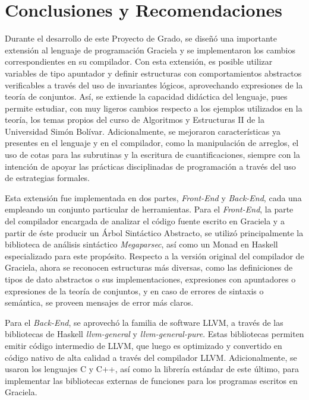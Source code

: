 \chapter*{Conclusiones y Recomendaciones}
\label{conclusiones}

Durante el desarrollo de este Proyecto de Grado, se diseñó una importante
extensión al lenguaje de programación Graciela y se implementaron los cambios
correspondientes en su compilador. Con esta extensión, es posible utilizar
variables de tipo apuntador y definir estructuras con comportamientos abstractos
verificables a través del uso de invariantes lógicos, aprovechando expresiones
de la teoría de conjuntos. Así, se extiende la capacidad didáctica del lenguaje,
pues permite estudiar, con muy ligeros cambios respecto a los ejemplos
utilizados en la teoría, los temas propios del curso de Algoritmos y Estructuras
II de la Universidad Simón Bolívar. Adicionalmente, se mejoraron características
ya presentes en el lenguaje y en el compilador, como la manipulación de
arreglos, el uso de cotas para las subrutinas y la escritura de
cuantificaciones, siempre con la intención de apoyar las prácticas disciplinadas
de programación a través del uso de estrategias formales.

Esta extensión fue implementada en dos partes, \textit{Front-End} y
\textit{Back-End}, cada una empleando un conjunto particular de herramientas.
Para el \textit{Front-End}, la parte del compilador encargada de analizar el
código fuente escrito en Graciela y a partir de éste producir un Árbol
Sintáctico Abstracto, se utilizó principalmente la biblioteca de análisis
sintáctico \textit{Megaparsec}, así como un Monad en Haskell especializado para
este propósito. Respecto a la versión original del compilador de Graciela, ahora
se reconocen estructuras más diversas, como las definiciones de tipos de dato
abstractos o sus implementaciones, expresiones con apuntadores o expresiones de
la teoría de conjuntos, y en caso de errores de sintaxis o semántica, se proveen
mensajes de error más claros.

Para el \textit{Back-End}, se aprovechó la familia de software LLVM, a través de
las bibliotecas de Haskell \textit{llvm-general} y \textit{llvm-general-pure}.
Estas bibliotecas permiten emitir código intermedio de LLVM, que luego es
optimizado y convertido en código nativo de alta calidad a través del compilador
LLVM. Adicionalmente, se usaron los lenguajes C y C++, así como la librería
estándar de este último, para implementar las bibliotecas externas de funciones
para los programas escritos en Graciela.

